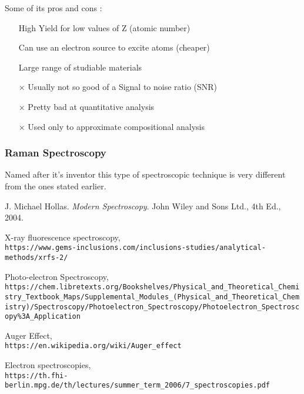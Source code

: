 \documentclass[]{article}
\begin{document}
\newpage

Some of its pros and cons \cite{TH_Many}:
\begin{itemize}
\item[\checkmark] High Yield for low values of Z (atomic number)
\item[\checkmark] Can use an electron source to excite atoms (cheaper)
\item[\checkmark] Large range of studiable materials
\item[$\times$] Usually not so good of a Signal to noise ratio (SNR)
\item[$\times$] Pretty bad at quantitative analysis
\item[$\times$] Used only to approximate compositional analysis
\end{itemize}

\subsubsection{Raman Spectroscopy}
Named after it's inventor this type of spectroscopic technique is very different from the ones stated earlier.

\newpage

\begin{thebibliography}{9}
J. Michael Hollas. 
\textit{Modern Spectroscopy}. 
John Wiley and Sons Ltd., 4th Ed., 2004.

X-ray fluorescence spectroscopy,
\\\texttt{https://www.gems-inclusions.com/inclusions-studies/analytical-methods/xrfs-2/}

Photo-electron Spectroscopy,
\\\texttt{https://chem.libretexts.org/Bookshelves/Physical\_and\_Theoretical\_Chemistry\_Textbook\_Maps/Supplemental\_Modules\_(Physical\_and\_Theoretical\_Chemistry)/Spectroscopy/Photoelectron\_Spectroscopy/Photoelectron\_Spectroscopy\%3A\_Application}

Auger Effect,
\\\texttt{https://en.wikipedia.org/wiki/Auger\_effect}

Electron spectroscopies,
\\\texttt{https://th.fhi-berlin.mpg.de/th/lectures/summer\_term\_2006/7\_spectroscopies.pdf}

\end{thebibliography}
\end{document}
